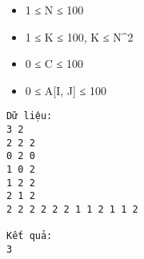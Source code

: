 \begin{itemize}
	\item 1 ≤ N ≤ 100
	\item 1 ≤ K ≤ 100, K ≤ N^2
	\item 0 ≤ C ≤ 100
	\item 0 ≤ A[I, J] ≤ 100
\end{itemize}
\begin{verbatim}
Dữ liệu:
3 2
2 2 2
0 2 0
1 0 2
1 2 2
2 1 2
2 2 2 2 2 2 1 1 2 1 1 2

Kết quả:
3
\end{verbatim}